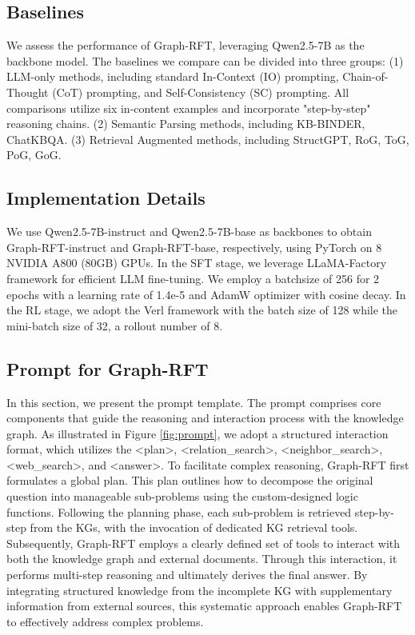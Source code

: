 \documentclass[sigconf]{acmart}
\begin{document}
\subsection{Baselines}
\label{app:baseline}
\begin{sloppypar}
We assess the performance of Graph-RFT, leveraging Qwen2.5-7B as the backbone model. The baselines we compare can be divided into three groups: (1) LLM-only methods, including standard In-Context (IO) prompting, Chain-of-Thought (CoT) prompting, and Self-Consistency (SC) prompting. All comparisons utilize six in-content examples and incorporate "step-by-step" reasoning chains. (2) Semantic Parsing methods, including KB-BINDER\cite{li2023few}, ChatKBQA\cite{luo2023chatkbqa}. (3) Retrieval Augmented methods, including StructGPT\cite{jiang2023structgpt}, RoG\cite{luo2023reasoning}, ToG\cite{sun2023think}, PoG\cite{tan2025paths}, GoG\cite{xu2024generate}. 
\end{sloppypar}


\subsection{Implementation Details}
\label{app:imp}
We use Qwen2.5-7B-instruct and Qwen2.5-7B-base as backbones \cite{team2024qwen2} to obtain Graph-RFT-instruct and Graph-RFT-base, respectively, using PyTorch on 8 NVIDIA A800 (80GB) GPUs. In the SFT stage, we leverage LLaMA-Factory framework for efficient LLM fine-tuning. We employ a batchsize of 256 for 2 epochs with a learning rate of 1.4e-5 and AdamW optimizer with cosine decay. In the RL stage, we adopt the Verl framework with the batch size of 128 while the mini-batch size of 32, a rollout number of 8.
\subsection{Prompt for Graph-RFT}
\label{app:prompt}
In this section, we present the prompt template. The prompt comprises core components that guide the reasoning and interaction process with the knowledge graph. As illustrated in Figure \ref{fig:prompt}, we adopt a structured interaction format, which utilizes the <plan>, <relation\_search>, <neighbor\_search>, <web\_search>, and <answer>.
To facilitate complex reasoning, Graph-RFT first formulates a global plan. This plan outlines how to decompose the original question into manageable sub-problems using the custom-designed logic functions. Following the planning phase, each sub-problem is retrieved step-by-step from the KGs, with the invocation of dedicated KG retrieval tools.
Subsequently, Graph-RFT employs a clearly defined set of tools to interact with both the knowledge graph and external documents. Through this interaction, it performs multi-step reasoning and ultimately derives the final answer. By integrating structured knowledge from the incomplete KG with supplementary information from external sources, this systematic approach enables Graph-RFT to effectively address complex problems.
\end{document}
